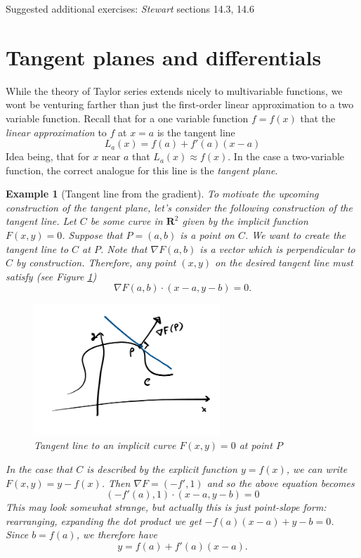 \documentclass[12pt]{article}
\numberwithin{equation}{subsection}
\numberwithin{figure}{subsection}
\theoremstyle{note}
\newtheorem{example}[subsection]{Example}
\begin{document}
{Suggested additional exercises: \textit{Stewart} sections 14.3, 14.6

\section{Tangent planes and differentials} \label{sec-tan-plane}

While the theory of Taylor series extends nicely to multivariable functions, we wont be venturing farther than just the first-order linear approximation to a two variable function. Recall that for a one variable function $f=f(x)$ that the \textit{linear approximation} to $f$ at $x=a$ is the tangent line \begin{equation} L_a(x)=f(a)+f'(a)(x-a)\end{equation} Idea being, that for $x$ near $a$ that $L_a(x)\approx f(x)$. In the case a two-variable function, the correct analogue for this line is the \textit{tangent plane}.

\begin{example}[Tangent line from the gradient]
To motivate the upcoming construction of the tangent plane, let's consider the following construction of the tangent line. Let $C$ be some curve in $\mathbf{R}^2$ given by the implicit function $F(x,y)=0$. Suppose that $P=(a,b)$ is a point on $C$. We want to create the tangent line to $C$ at $P$. Note that $\nabla F(a,b)$ is a vector which is perpendicular to $C$ by construction. Therefore, any point $(x,y)$ on the desired tangent line must satisfy (see Figure \ref{fig-tan-line}) \[\nabla F(a,b) \cdot (x-a,y-b)=0.\]
\begin{figure}[h!]
\centering
\includegraphics[width=70mm]{Images/tangent-line-grad}
\caption{Tangent line to an implicit curve $F(x,y)=0$ at point $P$}
\label{fig-tan-line}
\end{figure}
In the case that $C$ is described by the \textit{explicit} function $y=f(x)$, we can write $F(x,y)=y-f(x)$. Then $\nabla F=(-f',1)$ and so the above equation becomes \[ (-f'(a),1)\cdot(x-a,y-b)=0\] This may look somewhat strange, but actually this is just point-slope form: rearranging, expanding the dot product we get $-f(a)(x-a)+y-b=0$. Since $b=f(a)$, we therefore have \[y=f(a)+f'(a)(x-a).\]


\end{example}}
\end{document}
